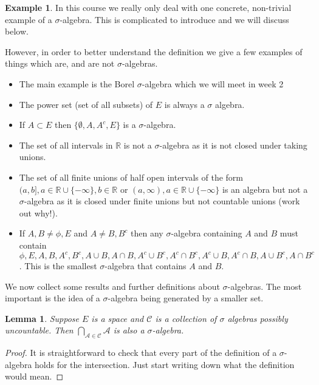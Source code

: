 \documentclass[
]{book}
\providecommand{\tightlist}{%
  \setlength{\itemsep}{0pt}\setlength{\parskip}{0pt}}
\newtheorem{lemma}{Lemma}[chapter]
\theoremstyle{definition}
\theoremstyle{definition}
\newtheorem{example}{Example}[chapter]
\theoremstyle{definition}
\theoremstyle{definition}
\theoremstyle{remark}
\begin{document}
\begin{example}

In this course we really only deal with one concrete, non-trivial example of a \(\sigma\)-algebra. This is complicated to introduce and we will discuss below.

However, in order to better understand the definition we give a few examples of things which are, and are not \(\sigma\)-algebras.

\begin{itemize}
\tightlist
\item
  The main example is the Borel \(\sigma\)-algebra which we will meet in week 2
\item
  The power set (set of all subsets) of \(E\) is always a \(\sigma\) algebra.
\item
  If \(A \subset E\) then \(\{\emptyset, A, A^c, E\}\) is a \(\sigma\)-algebra.
\item
  The set of all intervals in \(\mathbb{R}\) is not a \(\sigma\)-algebra as it is not closed under taking unions.
\item
  The set of all finite unions of half open intervals of the form\((a,b], a \in \mathbb{R}\cup\{-\infty\}, b \in \mathbb{R}\) or \((a, \infty), a \in \mathbb{R}\cup\{-\infty\}\) is an algebra but not a \(\sigma\)-algebra as it is closed under finite unions but not countable unions (work out why!).
\item
  If \(A, B \neq \phi, E\) and \(A \neq B, B^c\) then any \(\sigma\)-algebra containing \(A\) and \(B\) must contain \(\phi, E, A, B, A^c, B^c, A\cup B, A\cap B, A^c \cup B^c, A^c \cap B^c, A^c \cup B, A^c \cap B, A \cup B^c, A \cap B^c\). This is the smallest \(\sigma\)-algebra that contains \(A\) and \(B\).
\end{itemize}

\end{example}

We now collect some results and further definitions about \(\sigma\)-algebras. The most important is the idea of a \(\sigma\)-algebra being generated by a smaller set.

\begin{lemma}
Suppose \(E\) is a space and \(\mathcal{C}\) is a collection of \(\sigma\) algebras possibly uncountable. Then \(\bigcap_{\mathcal{A} \in \mathcal{C}} \mathcal{A}\) is also a \(\sigma\)-algebra.
\end{lemma}

\begin{proof}
It is straightforward to check that every part of the definition of a \(\sigma\)-algebra holds for the intersection. Just start writing down what the definition would mean.
\end{proof}
\end{document}
